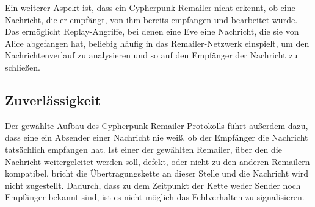 Ein weiterer Aspekt ist, dass ein Cypherpunk-Remailer nicht erkennt, ob eine Nachricht, die er empfängt, von ihm bereits empfangen und bearbeitet wurde. Das ermöglicht Replay-Angriffe, bei denen eine Eve eine Nachricht, die sie von Alice abgefangen hat, beliebig häufig in das Remailer-Netzwerk einspielt, um den Nachrichtenverlauf zu analysieren und so auf den Empfänger der Nachricht zu schließen.

\subsection{Zuverlässigkeit}
Der gewählte Aufbau des Cypherpunk-Remailer Protokolls führt außerdem dazu, dass eine ein Absender einer Nachricht nie weiß, ob der Empfänger die Nachricht tatsächlich empfangen hat. Ist einer der gewählten Remailer, über den die Nachricht weitergeleitet werden soll, defekt, oder nicht zu den anderen Remailern kompatibel, bricht die Übertragungskette an dieser Stelle und die Nachricht wird nicht zugestellt. Dadurch, dass zu dem Zeitpunkt der Kette weder Sender noch Empfänger bekannt sind, ist es nicht möglich das Fehlverhalten zu signalisieren. 